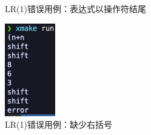 \begin{figure}[htbp]
\begin{minipage}[t]{0.2\textwidth}
        \caption{LR(1)错误用例：表达式以操作符结尾}
        \label{fig:lr-8}
    \end{minipage}
    \begin{minipage}[t]{0.2\textwidth}
        \centering
        \includegraphics[width=\textwidth]{images/lr_9.png}
        \caption{LR(1)错误用例：缺少右括号}
        \label{fig:lr-9}
    \end{minipage}
\end{figure}


